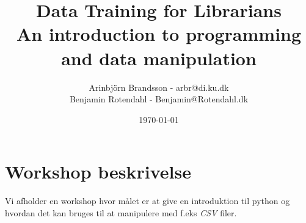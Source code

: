 \documentclass{article}
\title{
      \vspace{13em}
      \Large{Data Training for Librarians} \\
      \Huge{An introduction to programming and data manipulation}
    }
\author{
        \Large{Arinbjörn Brandsson - arbr@di.ku.dk} \\
        \Large{Benjamin Rotendahl - Benjamin@Rotendahl.dk} \\
    }
\date{
        \vspace{22em}
        \today \\
    }
\begin{document}
    \clearpage

    \maketitle              %
    \thispagestyle{empty}   %
    \newpage                %
    \setcounter{page}{1}    %

\section{Workshop beskrivelse}
    Vi afholder en workshop hvor målet er at give en introduktion til python og
    hvordan det kan bruges til at manipulere med f.eks \emph{CSV} filer.
\end{document}
